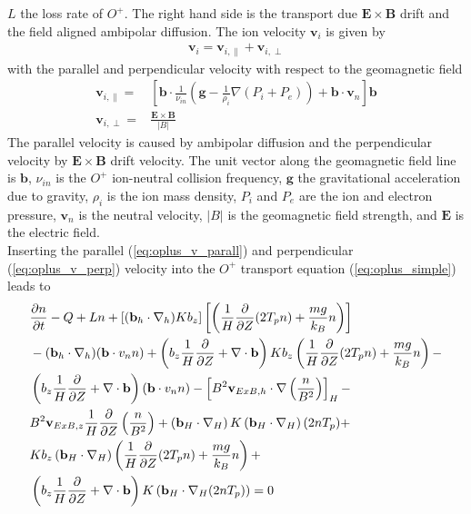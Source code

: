 $L$ the loss rate of $O^+$. The right hand side is the transport due
$\mathbf{E} \times \mathbf{B}$ drift and the field aligned ambipolar
diffusion. The ion velocity $\mathbf{v}_i$ is given by
%
\begin{align}
  \mathbf{v}_i = \mathbf{v}_{i,\parallel} + \mathbf{v}_{i,\perp}
\end{align}
%
with the parallel and perpendicular velocity with respect to the
geomagnetic field
%
\begin{align}
  \mathbf{v}_{i,\parallel} = & \left[ \mathbf{b} \cdot \frac{1}{\nu_{in}} \left( \mathbf{g}
     - \frac{1}{\rho_i} \nabla (P_i + P_e)\right)+ \mathbf{b} \cdot
     \mathbf{v}_n\right] \mathbf{b} \label{eq:oplus_v_parall}\\
 \mathbf{v}_{i,\perp} = & \frac{\mathbf{E} \times \mathbf{B}}{|B|} \label{eq:oplus_v_perp}
\end{align}
%
The parallel velocity is caused by ambipolar diffusion and the
perpendicular velocity by $\mathbf{E} \times \mathbf{B}$ drift
velocity. The unit vector along the geomagnetic field line is
$\mathbf{b}$, $\nu_{in}$ is the $O^+$ ion-neutral collision
frequency, $\mathbf{g}$ the gravitational acceleration due to
gravity, $\rho_i$ is the ion mass density, $P_i$ and $P_e$ are the
ion and electron pressure, $\mathbf{v}_n$ is the neutral velocity,
$|B|$ is the geomagnetic field strength, and $\mathbf{E}$ is the
electric field. \\
Inserting the parallel (\ref{eq:oplus_v_parall}) and perpendicular
(\ref{eq:oplus_v_perp}) velocity into the $O^+$ transport equation
(\ref{eq:oplus_simple}) leads to
%
\begin{align}
  {}& \frac{\partial n}{\partial t} - Q + Ln + \left[ (\mathbf{b}_h \cdot \nabla_h)
  K b_z\right] \left[ \left( \frac{1}{H}\frac{\partial}{\partial Z} (2 T_p n) + \frac{m g}{k_B}n\right)
  \right] \notag \\
  {}& - (\mathbf{b}_h \cdot \nabla_h)(\mathbf{b}\cdot{v}_n n) +
  \left( b_z \frac{1}{H} \frac{\partial}{\partial Z} + \nabla \cdot
  \mathbf{b} \right) K b_z \left( \frac{1}{H} \frac{\partial}{\partial Z} (2 T_p n) + \frac{m g}{k_B} n\right)
   - \notag \\
  {}& \left( b_z \frac{1}{H} \frac{\partial}{\partial Z} + \nabla \cdot
  \mathbf{b} \right)(\mathbf{b}\cdot{v}_n n) - \left[ B^2 \mathbf{v}_{ExB,h} \cdot
  \nabla \left( \frac{n}{B^2}\right)\right]_H - \notag \\
  {}& B^2 \mathbf{v}_{ExB,z} \frac{1}{H} \frac{\partial}{\partial Z}
  \left( \frac{n}{B^2}\right) + \left( \mathbf{b}_H\cdot \nabla_H
  \right) K \left( \mathbf{b}_H\cdot \nabla_H \right) (2 n T_p) + \notag \\
  {}& K b_z \left( \mathbf{b}_H\cdot \nabla_H \right) \left( \frac{1}{H} \frac{\partial}{\partial Z} (2 T_p n) +
   \frac{m g}{k_B}n \right)  + \notag \\
   {}& \left( b_z \frac{1}{H} \frac{\partial}{\partial Z} + \nabla \cdot \mathbf{b}\right)
   K \left( \mathbf{b}_H \cdot \nabla_H (2 n T_p)\right) = 0 \label{eq:oplus_optrans}
\end{align}
